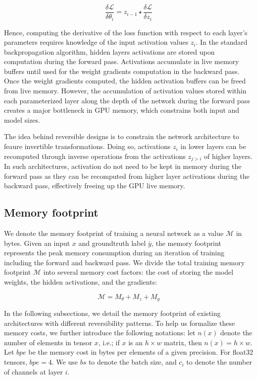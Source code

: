 \documentclass[twocolumn]{bmcart}
\begin{document}
 \begin{equation}
\frac{\delta \mathcal{L}}{\delta \theta_i} = z_{i-1} \star \frac{\delta \mathcal{L}}{\delta z_i} 
 \end{equation}

Hence, computing the derivative of the loss function with respect to each layer's parameters requires knowledge of the input activation values $z_i$.  In the standard backpropagation algorithm, hidden layers activations are stored upon computation during the forward pass. Activations accumulate in live memory buffers until used for the weight gradients computation in the backward pass. Once the weight gradients computed, the hidden activation buffers can be freed from live memory. 
However, the accumulation of activation values stored within each parameterized layer along the depth of the network during the forward pass creates a major bottleneck in GPU memory, which constrains both input and model sizes.

The idea behind reversible designs is to constrain the network architecture to feaure invertible transformations. 
Doing so, activations $z_i$ in lower layers can be recomputed through inverse operations from the activations $z_{j>i}$ of higher layers. 
In such architectures, activation do not need to be kept in memory during the forward pass as they can be recomputed from higher layer activations during the backward pass, effectively freeing up the GPU live memory.

\subsection{Memory footprint}

We denote the memory footprint of training a neural network as a value $\mathcal{M}$ in bytes. Given an input $x$ and groundtruth label $\bar{y}$, the memory footprint represents the peak memory consumption during an iteration of training including the forward and backward pass. 
We divide the total training memory footprint $\mathcal{M}$ into several memory cost factors: the cost of storing the model weights, the hidden activations, and the gradients:

\begin{equation}
\mathcal{M} = M_{\theta} + M_{z} + M_{g}
\end{equation}

In the following subsections, we detail the memory footprint of existing architectures with different reversibility patterns. 
To help us formalize these memory costs, we further introduce the following notations: let $n(x)$ denote the number of elements in tensor $x$, i.e.; if $x$ is an $h \times w$ matrix, then $n(x)=h \times w$. 
Let $bpe$ be the memory cost in bytes per elements of a given precision. 
For float32 tensors, $bpe=4$. We use $bs$ to denote the batch size, and $c_i$ to denote the number of channels at layer $i$.
\end{document}
